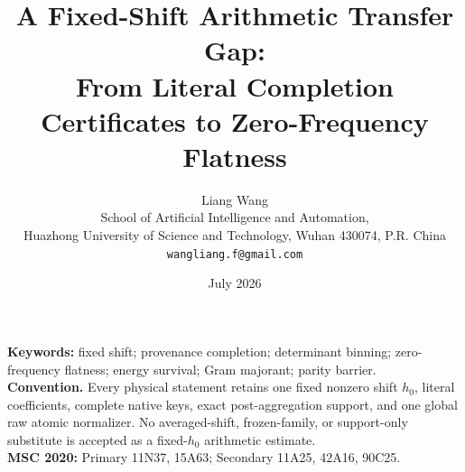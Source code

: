 \documentclass[11pt]{article}
\title{A Fixed-Shift Arithmetic Transfer Gap:\\
From Literal Completion Certificates to Zero-Frequency Flatness}
\author{Liang Wang\\
School of Artificial Intelligence and Automation,\\
Huazhong University of Science and Technology, Wuhan 430074, P.R. China\\
\texttt{wangliang.f@gmail.com}}
\date{July 2026}
\theoremstyle{remark}
\begin{document}
\maketitle


\noindent\textbf{Keywords:} fixed shift; provenance completion;
determinant binning; zero-frequency flatness; energy survival; Gram
majorant; parity barrier.\\[0.5em]
\noindent\textbf{Convention.} Every physical statement retains one
fixed nonzero shift \(h_0\), literal coefficients, complete native
keys, exact post-aggregation support, and one global raw atomic
normalizer.  No averaged-shift, frozen-family, or support-only
substitute is accepted as a fixed-\(h_0\) arithmetic estimate.\\[0.5em]
\noindent\textbf{MSC 2020:} Primary 11N37, 15A63; Secondary 11A25,
42A16, 90C25.











\begingroup
\small
\raggedright


\endgroup
\end{document}

